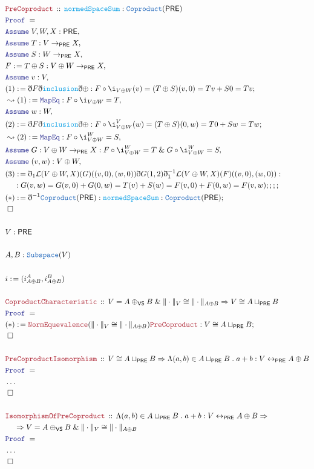 \documentclass[12pt]{scrartcl}
\newcommand{\TYPE}[1]{\textcolor{NavyBlue}{\mathtt{#1}}}
\newcommand{\FUNC}[1]{\textcolor{Cerulean}{\mathtt{#1}}}
\newcommand{\LOGIC}[1]{\textcolor{Blue}{\mathtt{#1}}}
\newcommand{\THM}[1]{\textcolor{Maroon}{\mathtt{#1}}}
\renewcommand{\.}{\; . \;}
\newcommand{\de}{: \kern 0.1pc =}
\newcommand{\Theorem}[2]{& \THM{#1} \, :: \, #2 \\ & \Proof = \\ }
\newcommand{\NewLine}{\\ & \kern 1pc}
\newcommand{\Page}[1]{\begin{align*} #1 \end{align*} \newpage   }
\newcommand{ \bd }{ \ByDef }
\newcommand{\NoProof}{ & \ldots \\ \EndProof}
\renewcommand{\And}{\; \& \;}
\newcommand{\ToBij}{\leftrightarrow}
\newcommand{\Say}[3]{& #1 \de #2 : #3, \\}
\newcommand{\Conclude}[3]{& #1 \de #2 : #3; \\}
\newcommand{\Derive}[3]{& \leadsto #1 \de #2 : #3, \\}
\newcommand{\A}{\LOGIC{Assume} \;}
\newcommand{\Assume}[2]{& \A #1 : #2, \\}
\newcommand{\QED}{\; \square}
\newcommand{\EndProof}{& \QED \\}
\newcommand{\ByDef}{\eth}
\newcommand{\Proof}{\LOGIC{Proof} \; }
\newcommand{\PRE}{\mathsf{PRE}} %
\begin{document}
      \Page{ 
         \Theorem{PreCoproduct}{ \FUNC{normedSpaceSum} : \TYPE{Coproduct}(\PRE) }
         \Assume{V,W,X}{\PRE}
         \Assume{T}{V \to_\PRE X}
         \Assume{S}{W \to_\PRE X}
         \Say{F}{ T \oplus S }{ V \oplus W \to_\PRE X  }
         \Assume{v}{V}
         \Conclude{(1)}{\bd F \bd \FUNC{inclusion} \bd \oplus}{ F \circ \i_{V \oplus W} (v)  = (T \oplus S)(v,0) = Tv + S0 = Tv}
         \Derive{(1) }{\LOGIC{MapEq}}{ F \circ \i_{V \oplus W} = T  }
          \Assume{w}{W}
         \Conclude{(2)}{\bd F \bd \FUNC{inclusion} \bd \oplus}{ F \circ \i_{V \oplus W}^V (w)  = (T \oplus S)(0,w) = T0 + Sw = Tw}
         \Derive{(2) }{\LOGIC{MapEq}}{ F \circ \i_{V \oplus W}^W = S  }
         \Assume{G}{ V \oplus W \to_\PRE X :  F \circ \i_{V \oplus W}^W = T  \And G \circ \i_{V \oplus W}^W = S  }
         \Assume{(v,w)}{V \oplus W}
         \Conclude{(3)}{ \bd_1 \mathcal{L}(V \oplus W, X)(G)((v,0),(w,0))
          \bd G (1, 2)  \bd_1^{-1} \mathcal{L}(V \oplus W, X)(F)((v,0),(w,0))         
          }{ \NewLine : G(v,w) = G(v,0) + G(0,w) = T(v) + S(w) = F(v,0) + F(0,w) = F(v,w) ;;;  }
\Conclude{(*)}{\bd^{-1}\TYPE{Coproduct}(\PRE)}
{\FUNC{normedSpaceSum} : \TYPE{Coproduct}(\PRE)}
\EndProof
\\
&V : \PRE \\
\\
& A,B : \TYPE{Subspace}(V) \\
\\
& i \de (i^A_{A \oplus B}, i^B_{A \oplus B} ) \\
\\
\Theorem{CoproductCharacteristic}{V = A \oplus_{\mathsf{VS}} B \And \|\cdot\|_V \cong  \| \cdot \|_{A \oplus B} \Rightarrow V \cong A \sqcup_\PRE B}
\Conclude{(*)}{\THM{NormEquevalence}(\| \cdot \|_V \cong \| \cdot \|_{A \oplus B} )\THM{PreCoproduct}}{V \cong A \sqcup_\PRE B  }
\EndProof
\\
\Theorem{PreCoproductIsomorphism}{V \cong A \sqcup_\PRE B \Rightarrow
\Lambda (a,b) \in A \sqcup_\PRE B \. a + b : V \ToBij_\PRE A \oplus B }
\NoProof
\\
\Theorem{IsomorphismOfPreCoproduct}{
  \Lambda (a,b) \in A \sqcup_\PRE B \. a + b : V \ToBij_\PRE A \oplus B  \Rightarrow \NewLine
\Rightarrow  V = A \oplus_{\mathsf{VS}} B \And \|\cdot\|_V \cong  \| \cdot \|_{A \oplus B}
  }
   \NoProof
  \\
  }
\end{document}
